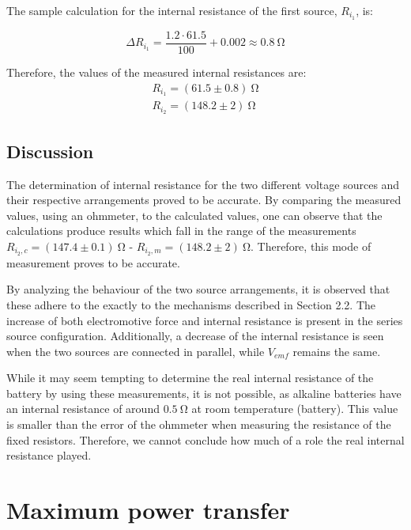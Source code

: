 \documentclass[a4paper]{article}
\newcommand{\unit}[1]{~\mathrm{#1}}
\begin{document}
The sample calculation for the internal resistance of the first source, $R_{i_1}$, is:

\[\Delta R_{i_1} = \frac{1.2 \cdot 61.5}{100} + 0.002 \approx 0.8\unit{\Omega}\]

Therefore, the values of the measured internal resistances are:
\begin{gather*}
    R_{i_1} = (61.5 \pm 0.8)\unit{\Omega}\\
    R_{i_2} = (148.2 \pm 2)\unit{\Omega}
\end{gather*}

\subsection{Discussion}
The determination of internal resistance for the two different voltage sources
and their respective arrangements proved to be accurate. By comparing the
measured values, using an ohmmeter, to the calculated values, one can observe
that the calculations produce results which fall in the range of the
measurements \textemdash $R_{i_2,c} = (147.4 \pm 0.1)\unit{\Omega}$ - $R_{i_2,m}
= (148.2 \pm 2)\unit{\Omega}$. Therefore, this mode of measurement proves to be
accurate.

By analyzing the behaviour of the two source arrangements, it is observed that
these adhere to the exactly to the mechanisms described in Section 2.2. The
increase of both electromotive force and internal resistance is present in the
series source configuration. Additionally, a decrease of the internal resistance
is seen when the two sources are connected in parallel, while $V_{emf}$ remains
the same.

While it may seem tempting to determine the real internal resistance of the
battery by using these measurements, it is not possible, as alkaline batteries
have an internal resistance of around $0.5 \unit{\Omega}$ at room temperature
(battery). This value is smaller than the error of the ohmmeter when measuring
the resistance of the fixed resistors. Therefore, we cannot conclude how much of
a role the real internal resistance played.

\section{Maximum power transfer}
\end{document}
